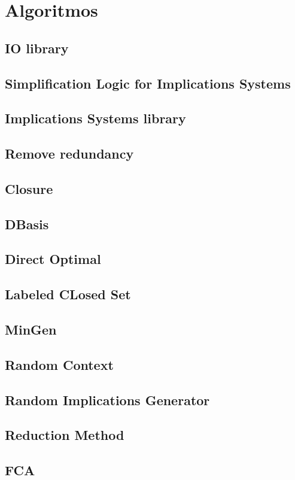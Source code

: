 \section{Algoritmos}
\subsection{IO library}




\subsection{Simplification Logic for Implications Systems}
\subsection{Implications Systems library}
\subsection{Remove redundancy}
\subsection{Closure}
\subsection{DBasis}
\subsection{Direct Optimal}
\subsection{Labeled CLosed Set}
\subsection{MinGen}
\subsection{Random Context}
\subsection{Random Implications Generator}
\subsection{Reduction Method}
\subsection{FCA}

\newpage
\thispagestyle{empty}
\mbox{}

\newpage